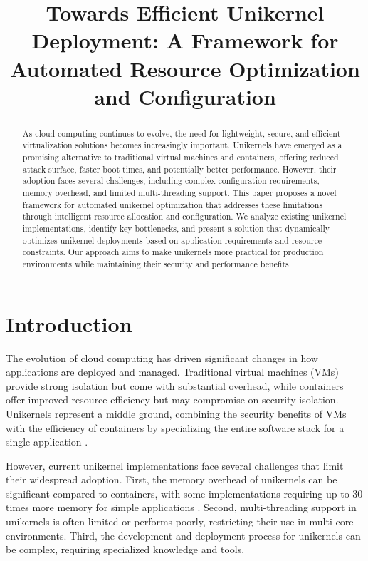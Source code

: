 \documentclass[conference]{IEEEtran}
\begin{document}
\title{Towards Efficient Unikernel Deployment: A Framework for Automated Resource Optimization and Configuration}

\author{
	}

\maketitle

\begin{abstract}
	As cloud computing continues to evolve, the need for lightweight, secure, and efficient virtualization solutions becomes increasingly important. Unikernels have emerged as a promising alternative to traditional virtual machines and containers, offering reduced attack surface, faster boot times, and potentially better performance. However, their adoption faces several challenges, including complex configuration requirements, memory overhead, and limited multi-threading support. This paper proposes a novel framework for automated unikernel optimization that addresses these limitations through intelligent resource allocation and configuration. We analyze existing unikernel implementations, identify key bottlenecks, and present a solution that dynamically optimizes unikernel deployments based on application requirements and resource constraints. Our approach aims to make unikernels more practical for production environments while maintaining their security and performance benefits.
\end{abstract}

\section{Introduction}
The evolution of cloud computing has driven significant changes in how applications are deployed and managed. Traditional virtual machines (VMs) provide strong isolation but come with substantial overhead, while containers offer improved resource efficiency but may compromise on security isolation. Unikernels represent a middle ground, combining the security benefits of VMs with the efficiency of containers by specializing the entire software stack for a single application \cite{linux_kernel_clothing}.

However, current unikernel implementations face several challenges that limit their widespread adoption. First, the memory overhead of unikernels can be significant compared to containers, with some implementations requiring up to 30 times more memory for simple applications \cite{unikernels_vs_containers}. Second, multi-threading support in unikernels is often limited or performs poorly, restricting their use in multi-core environments. Third, the development and deployment process for unikernels can be complex, requiring specialized knowledge and tools.
\end{document}
